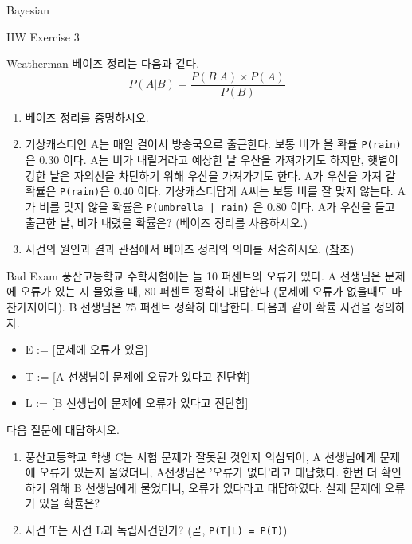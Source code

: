 \begin{edXchapter}{Bayesian}

\begin{edXsection}{HW Exercise 3}

\begin{edXvertical}

\begin{edXproblem}{Weatherman}
베이즈 정리는 다음과 같다.
\begin{equation}
P(A|B) = \frac{P(B|A) \times P(A)}{P(B)} 
\end{equation}
\begin{enumerate}
\item 베이즈 정리를 증명하시오.

\item 기상캐스터인 A는  매일 걸어서 방송국으로 출근한다. 보통 비가 올 확률 {\tt\LARGE P(rain)} 은  0.30 이다.
A는 비가 내릴거라고 예상한 날 우산을 가져가기도 하지만, 햇볕이 강한 날은 자외선을 차단하기 
위해 우산을 가져가기도 한다. A가 우산을 가져 갈 확률은 {\tt\LARGE P(rain)}은 0.40 이다. 
기상캐스터답게 A씨는 보통 비를 잘 맞지 않는다. A가 비를 맞지 않을 확률은 {\tt\LARGE P(umbrella | rain)} 은 0.80 이다.
A가 우산을 들고 출근한 날, 비가 내렸을 확률은? (베이즈 정리를 사용하시오.)
\item 사건의 원인과 결과 관점에서 베이즈 정리의 의미를 서술하시오.
(\href{http://ko.wikipedia.org/wiki/베이즈_정리} 참조)
\end{enumerate}
\end{edXproblem}

\begin{edXproblem}{Bad Exam}
풍산고등학교 수학시험에는 늘 10 퍼센트의 오류가 있다. A 선생님은 문제에 오류가 있는 지 물었을 때,
80 퍼센트 정확히 대답한다 (문제에 오류가 없을때도 마찬가지이다). B 선생님은 75 퍼센트 정확히 대답한다.
다음과 같이 확률 사건을 정의하자.
\begin{itemize}
\item E := [문제에 오류가 있음]
\item T := [A 선생님이 문제에 오류가 있다고 진단함]
\item L := [B 선생님이 문제에 오류가 있다고 진단함]
\end{itemize}

다음 질문에 대답하시오.
\begin{enumerate} 
\item 풍산고등학교 학생 C는 시험 문제가 잘못된 것인지 의심되어, 
A 선생님에게 문제에 오류가 있는지 물었더니, A선생님은 '오류가 없다'라고 대답했다.
한번 더 확인하기 위해 B 선생님에게 물었더니, 오류가 있다라고 대답하였다.
실제 문제에 오류가 있을 확률은?
\item 사건 T는 사건 L과 독립사건인가? (곧, {\tt\LARGE P(T|L) = P(T)})
\end{enumerate}
\end{edXproblem}


\end{edXvertical}
\end{edXsection}
\end{edXchapter}
